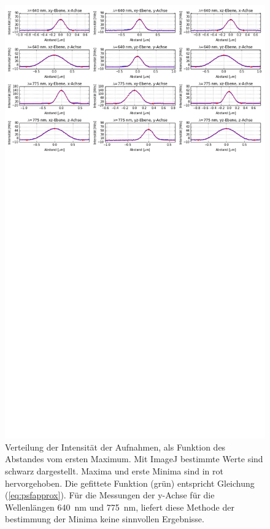 \begin{figure}
	\centering
	\includegraphics[trim= 0 950 0 0, width=\textwidth]{plots/goldbeads.png}
	\caption{Verteilung der Intensität der Aufnahmen, als Funktion des Abstandes vom ersten Maximum. Mit ImageJ bestimmte Werte sind schwarz dargestellt. 
		Maxima und erste Minima sind in rot hervorgehoben. 
		Die gefittete Funktion (grün) entspricht Gleichung (\ref{eq:psfapprox}). 
		Für die Messungen der y-Achse für die Wellenlängen 640~nm und 775~nm, liefert diese Methode der bestimmung der Minima keine sinnvollen Ergebnisse.
	}\label{fig:psffits}
\end{figure}
